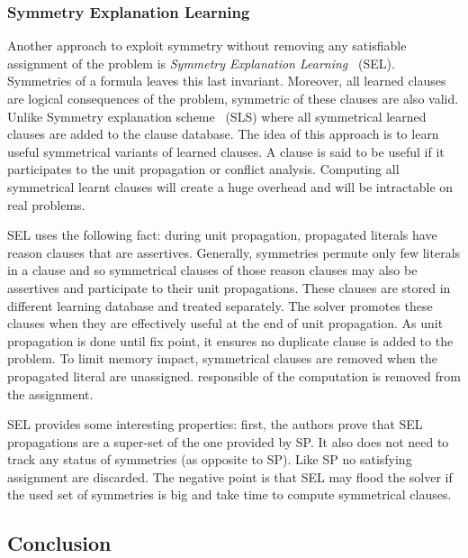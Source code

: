 \subsubsection{Symmetry Explanation Learning}


Another approach to exploit symmetry without removing any satisfiable assignment of the problem
is \emph{Symmetry Explanation Learning}~\cite{devriendt2017symmetric} (SEL). 
Symmetries of a formula leaves this last invariant. Moreover, all learned clauses are logical consequences of the problem, symmetric of these clauses are also valid.
Unlike Symmetry explanation scheme~\cite{benhamou2010enhancing} (SLS) where all symmetrical learned clauses
are added to the clause database.
The idea of this approach is to learn useful symmetrical variants of learned clauses.
 A clause is said to be useful if it participates to the unit propagation or conflict analysis.
Computing all symmetrical learnt clauses will create a huge overhead and will be intractable 
on real problems.

SEL uses the following fact:
during unit propagation, propagated literals have reason clauses that are assertives.
Generally, symmetries permute only few literals in a clause and so symmetrical clauses of those reason clauses may
also be assertives and participate to their unit propagations.
 These clauses are stored in different learning database and 
treated separately. The solver promotes these clauses when they are effectively useful
at the end of unit propagation. As unit propagation is done until fix point, it
ensures no duplicate clause is added to the problem.
To limit memory impact, symmetrical clauses are removed when the propagated literal are unassigned.
responsible of the computation is removed from the assignment.

SEL provides some interesting properties:
first, the authors prove that SEL propagations are a super-set of the one provided by SP. 
It also does not need to track any status of symmetries (as opposite to SP).
Like SP no satisfying assignment are discarded.
The negative point is that SEL may flood the solver if the used set of symmetries is big and take time 
to compute symmetrical clauses. 


\subsection{Conclusion} 

